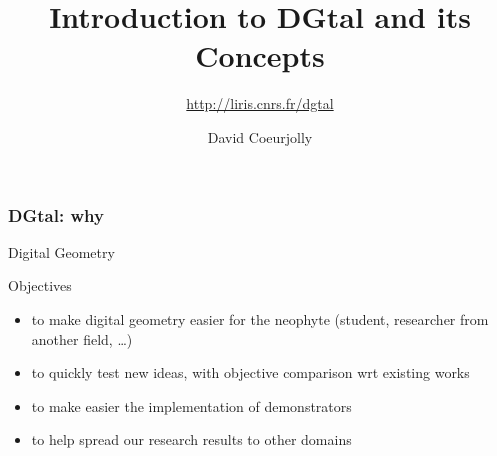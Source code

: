 \documentclass[8pt]{beamer}
\title[IPOL 2012 Meeting on Image Processing Libraries]{Introduction to  DGtal and its Concepts}
\subtitle{\url{http://liris.cnrs.fr/dgtal}}
\author[D. Coeurjolly]{David Coeurjolly}
\begin{document}
\small






\begin{frame}[plain]
  \titlepage
\end{frame}

\begin{frame}%
  \frametitle{DGtal: why}
    \begin{alertblock}{} 
    \centering \large \alert{Digital Geometry}
  \end{alertblock}
  
\begin{block}{Objectives}
    \small
    \begin{itemize}
    \item to make digital geometry easier for the neophyte (student,
      researcher from another field, \ldots)
    \item to quickly test  new ideas, with objective comparison wrt
      existing works
    \item to make easier the implementation of demonstrators
    \item to help spread our research results to other domains
    \end{itemize}
  \end{block}
  
\end{frame}
\end{document}
